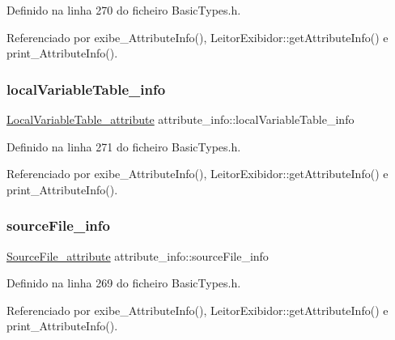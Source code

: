 Definido na linha 270 do ficheiro Basic\+Types.\+h.



Referenciado por exibe\+\_\+\+Attribute\+Info(), Leitor\+Exibidor\+::get\+Attribute\+Info() e print\+\_\+\+Attribute\+Info().

\mbox{\label{structattribute__info_a98095c1c653f2dd7e6f11330967829e8}} 
\subsubsection{\texorpdfstring{local\+Variable\+Table\+\_\+info}{localVariableTable\_info}}
{\footnotesize\ttfamily \hyperlink{structLocalVariableTable__attribute}{Local\+Variable\+Table\+\_\+attribute} attribute\+\_\+info\+::local\+Variable\+Table\+\_\+info}



Definido na linha 271 do ficheiro Basic\+Types.\+h.



Referenciado por exibe\+\_\+\+Attribute\+Info(), Leitor\+Exibidor\+::get\+Attribute\+Info() e print\+\_\+\+Attribute\+Info().

\mbox{\label{structattribute__info_a92dad0fdd4730da884a5ee0f2fc181e7}} 
\subsubsection{\texorpdfstring{source\+File\+\_\+info}{sourceFile\_info}}
{\footnotesize\ttfamily \hyperlink{structSourceFile__attribute}{Source\+File\+\_\+attribute} attribute\+\_\+info\+::source\+File\+\_\+info}



Definido na linha 269 do ficheiro Basic\+Types.\+h.



Referenciado por exibe\+\_\+\+Attribute\+Info(), Leitor\+Exibidor\+::get\+Attribute\+Info() e print\+\_\+\+Attribute\+Info().

\mbox{\label{structattribute__info_a8a7080734144a95a2b2a0fc350fd235c}} 
